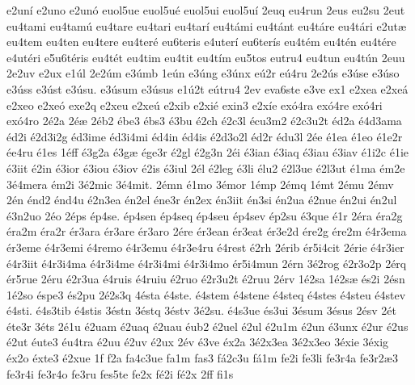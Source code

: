 {e2un^^ed
e2uno
e2un^^f3
euol5ue
euol5u^^e9
euol5ui
euol5u^^ed
2euq
eu4run
2eus
eu2su
2eut
eu4tami
eu4tam^^fa
eu4tare
eu4tari
eu4tar^^ed
eu4t^^e1mi
eu4t^^e1nt
eu4t^^e1re
eu4t^^e1ri
e2ut^^e6
eu4tem
eu4ten
eu4tere
eu4ter^^e9
eu6teris
e4uter^^ed
eu6ter^^eds
eu4t^^e9m
eu4t^^e9n
eu4t^^e9re
e4ut^^e9ri
e5u6t^^e9ris
eu4t^^e9t
eu4tim
eu4tit
eu4t^^edm
eu5tos
eutru4
eu4tun
eu4t^^fan
2euu
2e2uv
e2ux
e1^^fal
2e2^^fam
e3^^famb
1e^^fan
e3^^fang
e3^^fanx
e^^fa2r
e^^fa4ru
2e2^^fas
e3^^fase
e3^^faso
e3^^fass
e3^^fast
e3^^fasu.
e3^^fasum
e3^^fasus
e1^^fa2t
e^^fatru4
2ev
eva6ste
e3ve
ex1
e2xea
e2xe^^e1
e2xeo
e2xe^^f3
exe2q
e2xeu
e2xe^^fa
e2xib
e2xi^^e9
exin3
e2x^^ede
ex^^f34ra
ex^^f34re
ex^^f34ri
ex^^f34ro
2^^e92a
2^^e9^^e6
2^^e9b2
^^e9be3
^^e9bs3
^^e93bu
^^e92ch
^^e92c3l
^^e9cu3m2
^^e92c3u2t
^^e9d2a
^^e94d3ama
^^e9d2i
^^e92d3i2g
^^e9d3ime
^^e9d3i4mi
^^e9d4in
^^e9d4is
^^e92d3o2l
^^e9d2r
^^e9du3l
2^^e9e
^^e91ea
^^e91eo
^^e91e2r
^^e9e4ru
^^e91es
1^^e9ff
^^e93g2a
^^e93g^^e6
^^e9ge3r
^^e92gl
^^e92g3n
2^^e9i
^^e93ian
^^e93iaq
^^e93iau
^^e93iav
^^e91i2c
^^e91ie
^^e93iit
^^e92in
^^e93ior
^^e93iou
^^e93iov
^^e92is
^^e93iul
2^^e9l
^^e92leg
^^e93li
^^e9lu2
^^e92l3ue
^^e92l3ut
^^e91ma
^^e9m2e
3^^e94mera
^^e9m2i
3^^e92mic
3^^e94mit.
2^^e9mn
^^e91mo
3^^e9mor
1^^e9mp
2^^e9mq
1^^e9mt
2^^e9mu
2^^e9mv
2^^e9n
^^e9nd2
^^e9nd4u
^^e92n3ea
^^e9n2el
^^e9ne3r
^^e9n2ex
^^e9n3iit
^^e9n3si
^^e9n2ua
^^e92nue
^^e9n2ui
^^e9n2ul
^^e93n2uo
2^^e9o
2^^e9ps
^^e9p4se.
^^e9p4sen
^^e9p4seq
^^e9p4seu
^^e9p4sev
^^e9p2su
^^e93que
^^e91r
2^^e9ra
^^e9ra2g
^^e9ra2m
^^e9ra2r
^^e9r3ara
^^e9r3are
^^e9r3aro
2^^e9re
^^e9r3ean
^^e9r3eat
^^e9r3e2d
^^e9re2g
^^e9re2m
^^e94r3ema
^^e9r3eme
^^e94r3emi
^^e94remo
^^e94r3emu
^^e94r3e4ru
^^e94rest
^^e92rh
2^^e9rib
^^e9r5i4cit
2^^e9rie
^^e94r3ier
^^e94r3iit
^^e94r3i4ma
^^e94r3i4me
^^e94r3i4mi
^^e94r3i4mo
^^e9r5i4mun
2^^e9rn
3^^e92rog
^^e92r3o2p
2^^e9rq
^^e9r5rue
2^^e9ru
^^e92r3ua
^^e94ruis
^^e94ruiu
^^e92ruo
^^e92r3u2t
^^e92ruu
2^^e9rv
1^^e92sa
1^^e92s^^e6
^^e9s2i
2^^e9sn
1^^e92so
^^e9spe3
^^e9s2pu
2^^e92s3q
4^^e9sta
^^e94ste.
^^e94stem
^^e94stene
^^e94steq
^^e94stes
^^e94steu
^^e94stev
^^e94sti.
^^e94s3tib
^^e94stis
3^^e9stn
3^^e9stq
3^^e9stv
3^^e92su.
^^e94s3ue
^^e9s3ui
3^^e9sum
3^^e9sus
2^^e9sv
2^^e9t
^^e9te3r
3^^e9ts
2^^e91u
^^e92uam
^^e92uaq
^^e92uau
^^e9ub2
^^e92uel
^^e92ul
^^e92u1m
^^e92un
^^e93unx
^^e92ur
^^e92us
^^e92ut
^^e9ute3
^^e9u4tra
^^e92uu
^^e92uv
^^e92ux
2^^e9v
^^e93ve
^^e9x2a
3^^e92x3ea
3^^e92x3eo
3^^e9xie
3^^e9xig
^^e9x2o
^^e9xte3
^^e92xue
1f
f2a
fa4c3ue
fa1m
fas3
f^^e12c3u
f^^e11m
fe2i
fe3li
fe3r4a
fe3r2^^e63
fe3r4i
fe3r4o
fe3ru
fes5te
fe2x
f^^e92i
f^^e92x
2ff
fi1s
}
